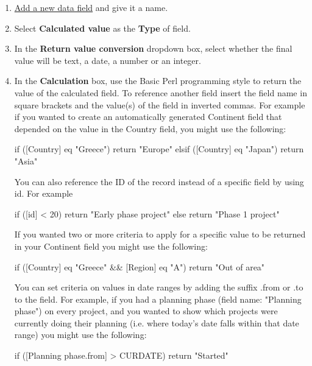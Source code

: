 \documentclass{ctrlo-int-toc}
\begin{document}
\begin{admin}
\begin{enumerate}
\item \hyperref[subsec:addfield]{Add a new data field} and give it a name. 
\item Select \textbf{Calculated value} as the \textbf{Type} of field. 
\item In the \textbf{Return value conversion} dropdown box, select whether the final value will be text, a date, a number or an integer.
\item In the \textbf{Calculation} box, use the Basic Perl programming style to return the value of the calculated field. To reference another field insert the field name in square brackets and the value(s) of the field in inverted commas. For example if you wanted to create an automatically generated Continent field that depended on the value in the Country field, you might use the following:

\begin{code}
if ([Country] eq "Greece") {
    return "Europe"
} elsif ([Country] eq "Japan") {
    return "Asia"
}
\end{code}

You can also reference the ID of the record instead of a specific field by using id. For example

\begin{code}
if ([id] < 20) {
    return "Early phase project"
} else {
    return "Phase 1 project"
}
\end{code}

If you wanted two or more criteria to apply for a specific value to be returned in your Continent field you might use the following:

\begin{code}
if ([Country] eq "Greece" && [Region] eq "A") {
    return "Out of area"
}
\end{code}

You can set criteria on values in date ranges by adding the suffix {\textquotedbl}.from{\textquotedbl} or {\textquotedbl}.to{\textquotedbl} to the field. For example, if you had a planning phase (field name: "Planning phase") on every project, and you wanted to show which projects were currently doing their planning (i.e. where today's date falls within that date range) you might use the following:

\begin{code}
if ([Planning phase.from] > CURDATE) {
    return "Started"
}
\end{code}


\end{enumerate}
\end{admin}
\end{document}
